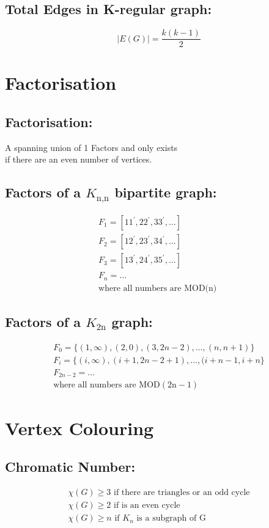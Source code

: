 \subsection{Total Edges in K-regular graph:}
$$
|E(G)|=\frac{k(k-1)}{2}
$$
%
%
\section{Factorisation}
%
\subsection{Factorisation:}
\begin{center}
A spanning union of 1 Factors and only exists\\ if there are an even number of vertices.
\end{center}
%
\subsection{Factors of a $K_\text{n,n}$ bipartite graph:}
$$
\begin{array}{l}
F_{1}=\left[11^{\prime}, 22^{\prime}, 33^{\prime}, \ldots\right]\\
F_{2}=\left[12^{\prime}, 23^{\prime}, 34^{\prime}, \ldots\right]\\
F_{3}=\left[13^{\prime}, 24^{\prime}, 35^{\prime}, \ldots\right]\\
F_{n}=\ldots\\
\text{where all numbers are MOD(n) }
\end{array}
$$
%
\subsection{Factors of a $K_\text{2n}$ graph:}
$$
\begin{array}{l}
F_{0}=\{(1, \infty),(2,0),(3,2 n-2), \ldots,(n, n+1)\}\\
F_{i}=\{(i, \infty),(i+1,2 n-2+1), \ldots,(i+n-1, i+n\}\\
F_{2 n-2}=\ldots\\
\text{where all numbers are } \mathrm{MOD}(2 \mathrm{n}-1)
\end{array}
$$
%
%
\section{Vertex Colouring}
%
\subsection{Chromatic Number:}
$$
\begin{array}{l}
\chi(G) \geq 3 \text{   if there are triangles or an odd cycle}\\
\chi(G) \geq 2 \text{   if is an even cycle}\\
\chi(G) \geq n \text{   if } K_{n} \text{ is a subgraph of G}
\end{array}
$$
%
